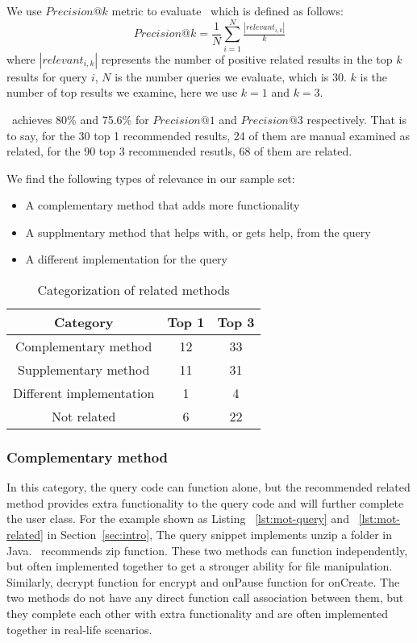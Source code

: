 We use $Precision@k$ metric to evaluate \tool\  which is defined as follows:
\begin{equation}
Precision@k = \frac{1}{N}\sum_{i=1}^{N}\tfrac{\left | relevant_{i,k} \right |}{k}
\end{equation}
where $\left | relevant_{i,k} \right |$ represents the number of positive related results in the top $k$ results for query $i$, $N$ is the number queries we evaluate, which is $30$. $k$ is the number of top results we examine, here we use $k=1$ and $k=3$.

\tool\ achieves 80\% and 75.6\% for $Precision@1$ and $Precision@3$ respectively. That is to say, for the 30 top 1 recommended results, 24 of them are manual examined as related, for the 90 top 3 recommended resutls, 68 of them are related.

We find the following types of relevance in our sample set:
\begin{itemize}
	\item A complementary method that adds more functionality
	\item A supplmentary method that helps with, or gets help, from the query 
	\item A different implementation for the query	
\end{itemize}

\begin{table}
	\begin{center}
		\begin{tabular}{ c|c|c } 
			Category & Top 1 & Top 3 \\\hline
			Complementary method &  12 & 33\\\hline 
			Supplementary method &  11 & 31 \\ \hline
			Different implementation &  1 & 4 \\ \hline
			Not related & 6 & 22
		\end{tabular}		
	\end{center}
	\caption{Categorization of related methods}
	\label{tab:categorization}
\end{table}
	
	

\subsubsection{Complementary method} In this category, the query code can function alone, but the recommended related method provides extra functionality to the query code and will further complete the user class. For the example shown as Listing ~\ref{lst:mot-query} and ~\ref{lst:mot-related} in Section~\ref{sec:intro}, The query snippet implements unzip a folder in Java.  \tool\ recommends {\ttt zip} function. These two methods can function independently, but often implemented together to get a stronger ability for file manipulation. Similarly, {\ttt decrypt} function for {\ttt encrypt} and {\ttt onPause} function for {\ttt onCreate}. The two methods do not have any direct function call association between them, but they complete each other with extra functionality and are often implemented together in real-life scenarios. 


